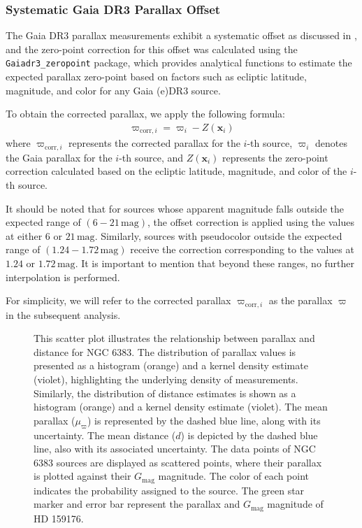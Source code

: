 \documentclass[fleqn,usenatbib,usedcolumn,useAMS]{mnras}
\begin{document}
\subsubsection{Systematic Gaia DR3 Parallax Offset}
The Gaia DR3 parallax measurements exhibit a systematic offset as discussed in \citet{2021A&A...649A...4L}, and the zero-point correction for this offset was calculated using the \texttt{Gaiadr3\_zeropoint} package, which provides analytical functions to estimate the expected parallax zero-point based on factors such as ecliptic latitude, magnitude, and color for any Gaia (e)DR3 source.

To obtain the corrected parallax, we apply the following formula:
\begin{align*}
\varpi_{\textrm{corr},i} = \varpi_i - Z(\boldsymbol{x}_i)
\end{align*}
where $\varpi_{\textrm{corr},i}$ represents the corrected parallax for the $i$-th source, $\varpi_i$ denotes the Gaia parallax for the $i$-th source, and $Z(\boldsymbol{x}_i)$ represents the zero-point correction calculated based on the ecliptic latitude, magnitude, and color of the $i$-th source.

It should be noted that for sources whose apparent magnitude falls outside the expected range of $(6-21\,\textrm{mag})$, the offset correction is applied using the values at either $6$ or $21\,\textrm{mag}$. Similarly, sources with pseudocolor outside the expected range of $(1.24-1.72\,\textrm{mag})$ receive the correction corresponding to the values at $1.24$ or $1.72\,\textrm{mag}$. It is important to mention that beyond these ranges, no further interpolation is performed.

For simplicity, we will refer to the corrected parallax $\varpi_{\textrm{corr},i}$ as the parallax $\varpi$ in the subsequent analysis.
\begin{figure}
	\centering
    \caption{This scatter plot illustrates the relationship between parallax and distance for NGC 6383. The distribution of parallax values is presented as a histogram (orange) and a kernel density estimate (violet), highlighting the underlying density of measurements. Similarly, the distribution of distance estimates is shown as a histogram (orange) and a kernel density estimate (violet). The mean parallax ($\mu_\varpi$) is represented by the dashed blue line, along with its uncertainty. The mean distance ($d$) is depicted by the dashed blue line, also with its associated uncertainty. The data points of NGC 6383 sources are displayed as scattered points, where their parallax is plotted against their $G_{\textrm{mag}}$ magnitude. The color of each point indicates the probability assigned to the source. The green star marker and error bar represent the parallax and $G_{\textrm{mag}}$ magnitude of HD 159176.}
    \label{fig:parallax}
\end{figure}
\end{document}
